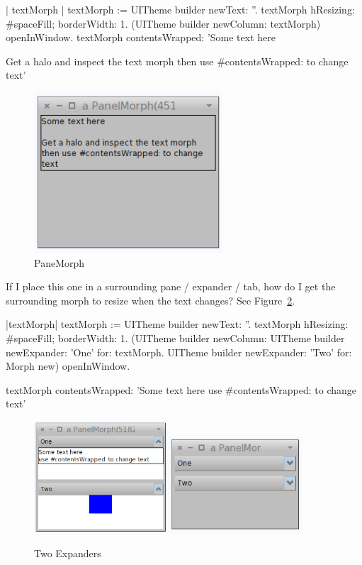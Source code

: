 \documentclass[a4paper,10pt,twoside]{book}
\begin{document}
\begin{code}{}
| textMorph |
textMorph := UITheme builder newText: ''.
textMorph
    hResizing: #spaceFill;
    borderWidth: 1.
(UITheme builder newColumn: {textMorph}) openInWindow.
textMorph contentsWrapped: 'Some text here

Get a halo and inspect the text morph
then use #contentsWrapped: to change text'
\end{code}

\begin{figure}[ht]\centering
	\includegraphics[width=7cm]{paneMorph}
	\caption{PaneMorph}
	\label{fig:paneMorph}
\end{figure}


If I place this one in a surrounding pane / expander / tab, how do I get the surrounding morph to resize when the text changes? See Figure~\ref{fig:expanders}.

\begin{code}{}
|textMorph|
textMorph := UITheme builder newText: ''.
textMorph
    hResizing: #spaceFill;
    borderWidth: 1.
(UITheme builder newColumn: {
    UITheme builder newExpander: 'One' for: textMorph.
    UITheme builder newExpander: 'Two' for: Morph new}) openInWindow.

textMorph contentsWrapped: 'Some text here
use #contentsWrapped: to change text'
\end{code}

\begin{figure}[ht]\centering
	\includegraphics[width=5cm]{expanded}\includegraphics[width=5cm]{expanded2}
	\caption{Two Expanders }
	\label{fig:expanders}
\end{figure}
\end{document}
